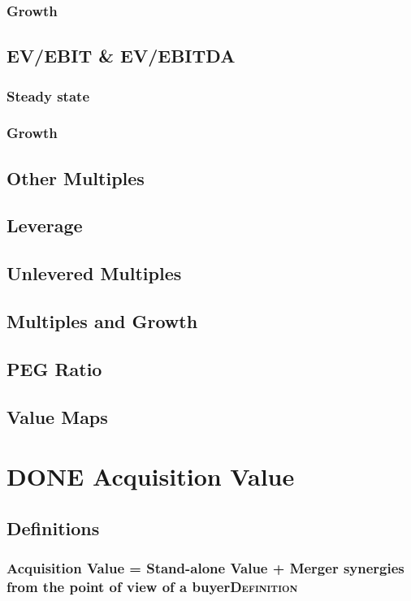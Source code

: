 \documentclass[11pt]{article}
\begin{document}
\subsubsection*{Growth}
\label{sec:orgc025481}
\subsection*{EV/EBIT \& EV/EBITDA}
\label{sec:orgf8576ed}
\subsubsection*{Steady state}
\label{sec:org5a622e8}
\subsubsection*{Growth}
\label{sec:orgd54d92a}
\subsection*{Other Multiples}
\label{sec:org9fa0619}
\subsection*{Leverage}
\label{sec:orgb314d3f}
\subsection*{Unlevered Multiples}
\label{sec:org28e8def}
\subsection*{Multiples and Growth}
\label{sec:orgc6ab68d}
\subsection*{PEG Ratio}
\label{sec:org235ab97}
\subsection*{Value Maps}
\label{sec:orgf22d5f3}
\section*{{\bfseries\sffamily DONE} Acquisition Value}
\label{sec:org818d7ca}
\subsection*{Definitions}
\label{sec:org08ba519}
\subsubsection*{Acquisition Value = Stand-alone Value + Merger synergies from the point of view of a buyer\hfill{}\textsc{Definition}}
\label{sec:org69e686c}
\end{document}
